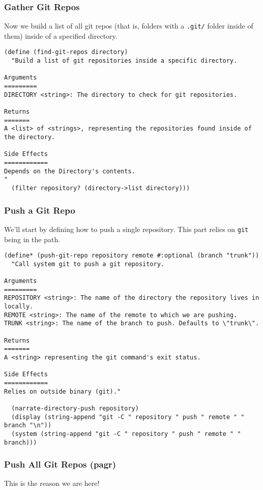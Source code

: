 \documentclass[11pt]{article}
\begin{document}
\subsubsection{Gather Git Repos}
\label{sec:org4cf259f}
Now we build a list of all git repos (that is, folders with a \texttt{.git/} folder
inside of them) inside of a specified directory.

\begin{verbatim}
(define (find-git-repos directory)
  "Build a list of git repositories inside a specific directory.

Arguments
=========
DIRECTORY <string>: The directory to check for git repositories.

Returns
=======
A <list> of <strings>, representing the repositories found inside of the directory.

Side Effects
============
Depends on the Directory's contents.
"
  (filter repository? (directory->list directory)))
\end{verbatim}

\subsubsection{Push a Git Repo}
\label{sec:org278b74d}
We'll start by defining how to push a single repository. This part relies on
\texttt{git} being in the path.

\begin{verbatim}
(define* (push-git-repo repository remote #:optional (branch "trunk"))
  "Call system git to push a git repository.

Arguments
=========
REPOSITORY <string>: The name of the directory the repository lives in locally.
REMOTE <string>: The name of the remote to which we are pushing.
TRUNK <string>: The name of the branch to push. Defaults to \"trunk\".

Returns
=======
A <string> representing the git command's exit status.

Side Effects
============
Relies on outside binary (git)."

  (narrate-directory-push repository)
  (display (string-append "git -C " repository " push " remote " " branch "\n"))
  (system (string-append "git -C " repository " push " remote " " branch)))
\end{verbatim}

\subsubsection{Push All Git Repos (pagr)}
\label{sec:orgad9846c}
This is the reason we are here!
\end{document}
